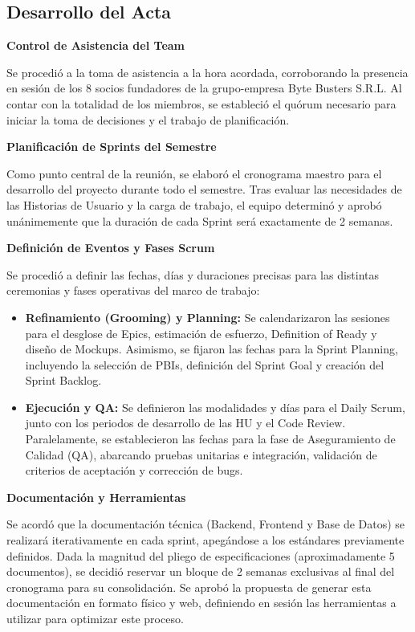 \newpage
\subsection{Desarrollo del Acta}

\noindent \textbf{Control de Asistencia del Team}\par
Se procedió a la toma de asistencia a la hora acordada, corroborando la presencia en sesión de los 8 socios fundadores de la grupo-empresa Byte Busters S.R.L. Al contar con la totalidad de los miembros, se estableció el quórum necesario para iniciar la toma de decisiones y el trabajo de planificación.

\vspace*{0.5cm}
\noindent\textbf{Planificación de Sprints del Semestre}\par
Como punto central de la reunión, se elaboró el cronograma maestro para el desarrollo del proyecto durante todo el semestre. Tras evaluar las necesidades de las Historias de Usuario y la carga de trabajo, el equipo determinó y aprobó unánimemente que la duración de cada Sprint será exactamente de 2 semanas.

\vspace*{0.5cm}
\noindent \textbf{Definición de Eventos y Fases Scrum}\par
Se procedió a definir las fechas, días y duraciones precisas para las distintas ceremonias y fases operativas del marco de trabajo:
\begin{itemize}[noitemsep]
    \item \textbf{Refinamiento (Grooming) y Planning:} Se calendarizaron las sesiones para el desglose de Epics, estimación de esfuerzo, Definition of Ready y diseño de Mockups. Asimismo, se fijaron las fechas para la Sprint Planning, incluyendo la selección de PBIs, definición del Sprint Goal y creación del Sprint Backlog.
    \item \textbf{Ejecución y QA:} Se definieron las modalidades y días para el Daily Scrum, junto con los periodos de desarrollo de las HU y el Code Review. Paralelamente, se establecieron las fechas para la fase de Aseguramiento de Calidad (QA), abarcando pruebas unitarias e integración, validación de criterios de aceptación y corrección de bugs.
\end{itemize}

\vspace*{0.5cm}
\noindent \textbf{Documentación y Herramientas}\par
Se acordó que la documentación técnica (Backend, Frontend y Base de Datos) se realizará iterativamente en cada sprint, apegándose a los estándares previamente definidos. Dada la magnitud del pliego de especificaciones (aproximadamente 5 documentos), se decidió reservar un bloque de 2 semanas exclusivas al final del cronograma para su consolidación. Se aprobó la propuesta de generar esta documentación en formato físico y web, definiendo en sesión las herramientas a utilizar para optimizar este proceso.

